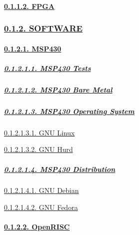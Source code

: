 \documentclass[
]{article}
\begin{document}
\hypertarget{fpga}{%
\paragraph{\texorpdfstring{\protect\hyperlink{fpga-1}{0.1.1.2.
FPGA}}{0.1.1.2. FPGA}}\label{fpga}}

\hypertarget{software}{%
\subsubsection{\texorpdfstring{\protect\hyperlink{software-1}{0.1.2.
SOFTWARE}}{0.1.2. SOFTWARE}}\label{software}}

\hypertarget{msp430}{%
\paragraph{\texorpdfstring{\protect\hyperlink{msp430-3}{0.1.2.1.
MSP430}}{0.1.2.1. MSP430}}\label{msp430}}

\hypertarget{msp430-tests}{%
\subparagraph{\texorpdfstring{\protect\hyperlink{msp430-tests-1}{0.1.2.1.1.
MSP430 Tests}}{0.1.2.1.1. MSP430 Tests}}\label{msp430-tests}}

\hypertarget{msp430-bare-metal}{%
\subparagraph{\texorpdfstring{\protect\hyperlink{msp430-bare-metal-1}{0.1.2.1.2.
MSP430 Bare
Metal}}{0.1.2.1.2. MSP430 Bare Metal}}\label{msp430-bare-metal}}

\hypertarget{msp430-operating-system}{%
\subparagraph{\texorpdfstring{\protect\hyperlink{msp430-operating-system-1}{0.1.2.1.3.
MSP430 Operating
System}}{0.1.2.1.3. MSP430 Operating System}}\label{msp430-operating-system}}

\protect\hyperlink{gnu-linux-3}{0.1.2.1.3.1. GNU Linux}

\protect\hyperlink{gnu-hurd-3}{0.1.2.1.3.2. GNU Hurd}

\hypertarget{msp430-distribution}{%
\subparagraph{\texorpdfstring{\protect\hyperlink{msp430-distribution-1}{0.1.2.1.4.
MSP430
Distribution}}{0.1.2.1.4. MSP430 Distribution}}\label{msp430-distribution}}

\protect\hyperlink{gnu-debian-3}{0.1.2.1.4.1. GNU Debian}

\protect\hyperlink{gnu-fedora-3}{0.1.2.1.4.2. GNU Fedora}

\hypertarget{openrisc}{%
\paragraph{\texorpdfstring{\protect\hyperlink{openrisc-3}{0.1.2.2.
OpenRISC}}{0.1.2.2. OpenRISC}}\label{openrisc}}
\end{document}
